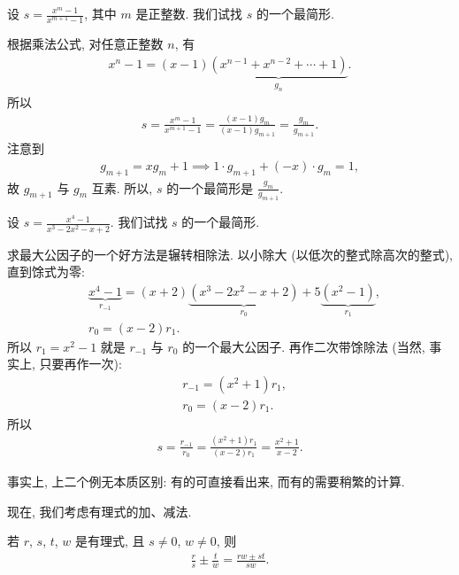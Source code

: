 \begin{example}
    设 $s = \frac{x^{m} - 1}{x^{m+1} - 1}$, 其中 $m$ 是正整数. 我们试找 $s$ 的一个最简形.

    根据乘法公式, 对任意正整数 $n$, 有
    \begin{align*}
        x^n - 1 = (x - 1) \underbrace{(x^{n-1} + x^{n-2} + \cdots + 1)}_{g_n}.
    \end{align*}
    所以
    \begin{align*}
        s = \frac{x^{m} - 1}{x^{m+1} - 1} = \frac{(x - 1) g_{m}}{(x - 1) g_{m+1}} = \frac{g_{m}}{g_{m+1}}.
    \end{align*}
    注意到
    \begin{align*}
        g_{m+1} = xg_{m} + 1 \implies 1 \cdot g_{m+1} + (-x) \cdot g_{m} = 1,
    \end{align*}
    故 $g_{m+1}$ 与 $g_{m}$ 互素. 所以, $s$ 的一个最简形是 $\frac{g_{m}}{g_{m+1}}$.
\end{example}

\begin{example}
    设 $s = \frac{x^4 - 1}{x^3 - 2x^2 - x + 2}$. 我们试找 $s$ 的一个最简形.

    求最大公因子的一个好方法是辗转相除法. 以小除大 (以低次的整式除高次的整式), 直到馀式为零:
    \begin{align*}
         & \underbrace{x^4 - 1}_{r_{-1}} = {(x + 2)\underbrace{(x^3 - 2x^2 - x + 2)}_{r_0}} + {5\underbrace{(x^2 - 1)}_{r_1}}, \\
         & r_0 = (x - 2) r_1.
    \end{align*}
    所以 $r_1 = x^2 - 1$ 就是 $r_{-1}$ 与 $r_0$ 的一个最大公因子. 再作二次带馀除法 (当然, 事实上, 只要再作一次):
    \begin{align*}
         & r_{-1} = (x^2 + 1) r_1, \\
         & r_0 = (x - 2) r_1.
    \end{align*}
    所以
    \begin{align*}
        s = \frac{r_{-1}}{r_0} = \frac{(x^2 + 1) r_1}{(x - 2) r_1} = \frac{x^2 + 1}{x - 2}.
    \end{align*}
\end{example}

\begin{remark}
    事实上, 上二个例无本质区别: 有的可直接看出来, 而有的需要稍繁的计算.
\end{remark}

现在, 我们考虑有理式的加、减法.

\begin{proposition}
    若 $r$, $s$, $t$, $w$ 是有理式, 且 $s \neq 0$, $w \neq 0$, 则
    \begin{align*}
        \frac{r}{s} \pm \frac{t}{w} = \frac{rw \pm st}{sw}.
    \end{align*}
\end{proposition}

